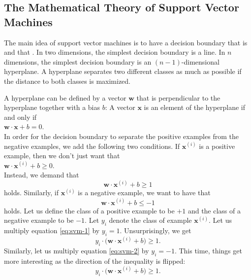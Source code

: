 \subsection{The Mathematical Theory of Support Vector Machines}
The main idea of support vector machines is to have a decision boundary that is  and that
.  In two dimensions, the simplest decision boundary is a
line.  In $n$ dimensions, the simplest decision boundary is an $(n-1)$-dimensional hyperplane.
A hyperplane separates two different classes as much as possible if the distance to both classes is maximized.

A hyperplane can be defined by a vector $\mathbf{w}$ that is perpendicular to the hyperplane together with a
bias $b$:  A vector $\mathbf{x}$ is an element of the hyperplane if and only if
\\[0.2cm]
\hspace*{1.3cm}
$\mathbf{w} \cdot \mathbf{x} + b = 0$.
\\[0.2cm]
In order for the decision boundary to separate the positive examples from the negative examples, we add the
following two conditions.  If $\mathbf{x}^{(i)}$ is a positive example, then we don't just want that 
\\[0.2cm]
\hspace*{1.3cm}
$\mathbf{w} \cdot \mathbf{x}^{(i)} + b \geq 0$.
\\[0.2cm]
Instead, we demand that 
\begin{equation}
  \label{eq:svm-1}
  \mathbf{w} \cdot \mathbf{x}^{(i)} + b \geq 1
\end{equation}
holds.  Similarly, if $\mathbf{x}^{(i)}$ is a negative example, we want to have that
\begin{equation}
  \label{eq:svm-2}
    \mathbf{w} \cdot \mathbf{x}^{(i)} + b \leq -1
\end{equation}
holds.  Let us define the class of a positive example to be $+1$ and the
class of a negative example to be $-1$.  Let $y_i$ denote the class of example $\mathbf{x}^{(i)}$.
Let us multiply equation \ref{eq:svm-1} by $y_i = 1$.  Unsurprisingly, we get
\begin{equation}
  \label{eq:svm-3}
  y_i \cdot \bigl(\mathbf{w} \cdot \mathbf{x}^{(i)} + b) \geq 1.
\end{equation}
Similarly, let us multiply equation \ref{eq:svm-2} by $y_i = -1$.  This time, things get more interesting
as the direction of the inequality is flipped:
\begin{equation}
  \label{eq:svm-4}
    y_i \cdot \bigl(\mathbf{w} \cdot \mathbf{x}^{(i)} + b) \geq 1.
\end{equation}
